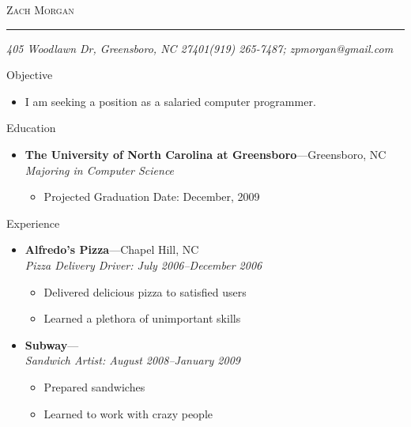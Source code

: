 \documentclass[11pt,oneside]{article}
\makeatletter
\newcommand{\name}{Zach Morgan}
\newcommand{\addr}{405 Woodlawn Dr, Greensboro, NC 27401}
\newcommand{\phone}{(919) 265-7487}
\newcommand{\email}{zpmorgan@gmail.com}
\newcommand{\bigname}[1]{
	\begin{center}\fontfamily{phv}\selectfont\Huge\scshape#1\end{center}
}
\newenvironment{ressection}[1]{
	\vspace{4pt}
	{\fontfamily{phv}\selectfont\Large#1}
	\begin{itemize}
	\vspace{3pt}
}{
	\end{itemize}
}
\newcommand{\resitem}[1]{
	\vspace{-4pt}
	\item \begin{flushleft} #1 \end{flushleft}
}
\newcommand{\ressubitem}[1]{
	\vspace{-1pt}
	\item \begin{flushleft} #1 \end{flushleft}
}
\newcommand{\resbigitem}[3]{
	\vspace{-5pt}
	\item
	\textbf{#1}---#2 \\
	\textit{#3}
}
\newenvironment{ressubsec}[3]{
	\resbigitem{#1}{#2}{#3}
	\vspace{-2pt}
	\begin{itemize}
}{
	\end{itemize}
}
\makeatother
\begin{document}
 \selectfont

\bigname{\name}

\vspace{-8pt} \rule{\textwidth}{1pt}

\vspace{-1pt} {\small\itshape \addr \hfill \phone; \email}

\vspace{8 pt}




\begin{ressection}{Objective}

   \resitem{I am seeking a position as a salaried computer programmer.}
	
\end{ressection}


\begin{ressection}{Education}

	\begin{ressubsec}{The University of North Carolina at Greensboro}{Greensboro, NC}{Majoring in Computer Science}
		\ressubitem{Projected Graduation Date: December, 2009}
	\end{ressubsec}

\end{ressection}


\begin{ressection}{Experience}

	\begin{ressubsec}{Alfredo's Pizza}{Chapel Hill, NC}{Pizza Delivery Driver: July 2006--December 2006}
		\ressubitem{Delivered delicious pizza to satisfied users}
		\ressubitem{Learned a plethora of unimportant skills}
	\end{ressubsec}

	\begin{ressubsec}{Subway}{}{Sandwich Artist: August 2008--January 2009}
		\ressubitem{Prepared sandwiches}
		\ressubitem{Learned to work with crazy people}
	\end{ressubsec}

\end{ressection}
\end{document}
